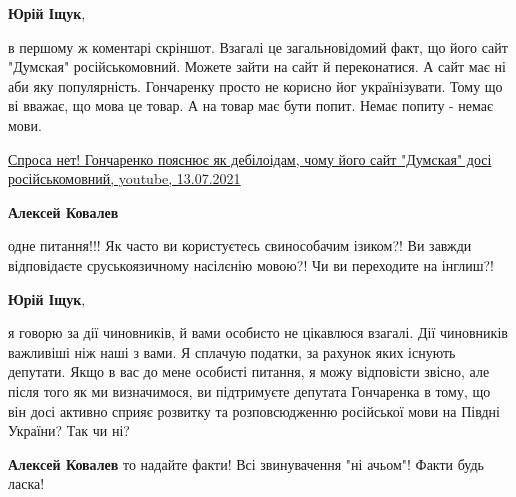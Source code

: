 \begin{itemize}
\begin{itemize}
 
\textbf{Юрій Іщук}, 

в першому ж коментарі скріншот. Взагалі це загальновідомий факт, що його сайт
"Думская" російськомовний. Можете зайти на сайт й переконатися. А сайт має ні
аби яку популярність. Гончаренку просто не корисно йог українізувати. Тому що
ві вважає, що мова це товар. А на товар має бути попит. Немає попиту - немає
мови.

\href{https://www.youtube.com/watch?v=PVzIi1KR-2g}{%
Спроса нет! Гончаренко пояснює як дебілоідам, чому його сайт "Думская" досі російськомовний, youtube, 13.07.2021%
}

 
\textbf{Алексей Ковалев} 

одне питання!!! Як часто ви користуєтесь свинособачим ізиком?! Ви завжди
відповідаєте сруськоязичному насілєнію мовою?! Чи ви переходите на інглиш?!


 
\textbf{Юрій Іщук}, 

я говорю за дії чиновників, й вами особисто не цікавлюся взагалі. Дії
чиновників важливіші ніж наші з вами. Я сплачую податки, за рахунок яких
існують депутати. Якщо в вас до мене особисті питання, я можу відповісти
звісно, але після того як ми визначимося, ви підтримуєте депутата Гончаренка в
тому, що він досі активно сприяє розвитку та розповсюдженню російської мови на
Півдні України? Так чи ні?

 
\textbf{Алексей Ковалев} то надайте факти! Всі звинувачення "ні ачьом"! Факти будь ласка!


\end{itemize}
\end{itemize}
